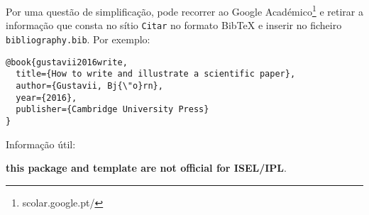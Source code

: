 Por uma questão de simplificação, pode recorrer ao  Google Académico\footnote{scolar.google.pt/} e retirar a informação que consta no sítio \texttt{Citar} no formato BibTeX e inserir no ficheiro \texttt{bibliography.bib}. Por exemplo:
\begin{verbatim}
@book{gustavii2016write,
  title={How to write and illustrate a scientific paper},
  author={Gustavii, Bj{\"o}rn},
  year={2016},
  publisher={Cambridge University Press}
}
\end{verbatim}


Informação útil:
\begin{center}
	\textbf{\large this package and template are not official for ISEL/IPL}.
\end{center}

